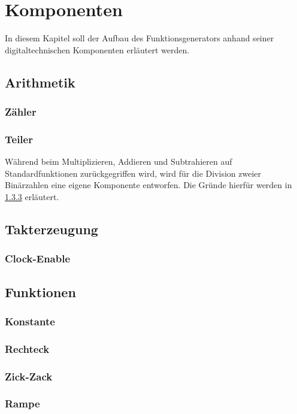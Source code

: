 \chapter{Komponenten}
In diesem Kapitel soll der Aufbau des Funktionsgenerators anhand seiner
digitaltechnischen Komponenten erläutert werden.

\section{Arithmetik}

\subsection{Zähler}
\subsection{Teiler}
Während beim Multiplizieren, Addieren und Subtrahieren auf Standardfunktionen
zurückgegriffen wird, wird für die Division zweier Binärzahlen eine eigene
Komponente entworfen. Die Gründe hierfür werden in \cref{Comp:Func:ZigZag}
erläutert. 

\section{Takterzeugung}
\subsection{Clock-Enable}

\section{Funktionen}   \label{Comp:Func}
\subsection{Konstante}   \label{Comp:Func:Const}
\subsection{Rechteck}   \label{Comp:Func:Square}
\subsection{Zick-Zack}  \label{Comp:Func:ZigZag}

\subsection{Rampe} \label{Comp:Func:Ramp}

